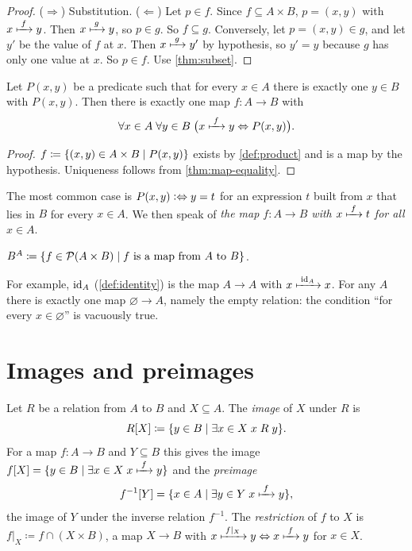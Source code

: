 \begin{proof}
($\Rightarrow$) Substitution. ($\Leftarrow$) Let $p \in f$. Since $f \subseteq A
\times B$, $p = (x, y)$ with $x \xmapsto{\;f\;} y$. Then $x \xmapsto{\;g\;} y$, so $p \in g$. So $f
\subseteq g$. Conversely, let $p = (x, y) \in g$, and let $y'$ be the value of $f$
at $x$. Then $x \xmapsto{\;g\;} y'$ by hypothesis, so $y' = y$ because $g$ has only one
value at $x$. So $p \in f$. Use \cref{thm:subset}.
\end{proof}

\begin{theorem}
\label{thm:map-rule}
Let $P(x, y)$ be a predicate such that for every $x \in A$ there is exactly one $y
\in B$ with $P(x, y)$. Then there is exactly one map $f \colon A \to B$ with
\[
  \forall x \in A\; \forall y \in B\; \bigl( x \xmapsto{\;f\;} y \Leftrightarrow P(x, y)
  \bigr).
\]
\end{theorem}

\begin{proof}
$f \coloneqq \lbrace (x, y) \in A \times B \mid P(x, y) \rbrace$ exists by
\cref{def:product} and is a map by the hypothesis. Uniqueness follows from
\cref{thm:map-equality}.
\end{proof}

The most common case is $P(x, y) \mathrel{\vcentcolon\Leftrightarrow} y = t$ for an expression $t$ built from
$x$ that lies in $B$ for every $x \in A$. We then speak of \emph{the map $f \colon
A \to B$ with $x \xmapsto{\;f\;} t$ for all $x \in A$}.

\begin{definition}
\label{def:map-set}
$B^A \coloneqq \lbrace f \in \mathcal{P} (A \times B) \mid f \text{ is a map from } A \text{
to } B \rbrace$.
\end{definition}

For example, $\mathrm{id}_A$ (\cref{def:identity}) is the map $A \to A$ with $x \xmapsto{\;\mathrm{id}_A\;}
x$. For any $A$ there is exactly one map $\varnothing \to A$, namely the empty
relation: the condition \enquote{for every $x \in \varnothing$} is vacuously true.

\section{Images and preimages}

\begin{definition}
\label{def:image}
Let $R$ be a relation from $A$ to $B$ and $X \subseteq A$. The \emph{image} of $X$
under $R$ is
\[
  R[X] \coloneqq \lbrace y \in B \mid \exists x \in X\; x \mathrel{R} y \rbrace.
\]
For a map $f \colon A \to B$ and $Y \subseteq B$ this gives the image $f[X] =
\lbrace y \in B \mid \exists x \in X\; x \xmapsto{\;f\;} y \rbrace$ and the \emph{preimage}
\[
  f^{-1}[Y] = \lbrace x \in A \mid \exists y \in Y\; x \xmapsto{\;f\;} y \rbrace,
\]
the image of $Y$ under the inverse relation $f^{-1}$. The \emph{restriction} of
$f$ to $X$ is $f|_X \coloneqq f \cap (X \times B)$, a map $X \to B$ with $x
\xmapsto{\;f|_X\;} y \Leftrightarrow x \xmapsto{\;f\;} y$ for $x \in X$.
\end{definition}

